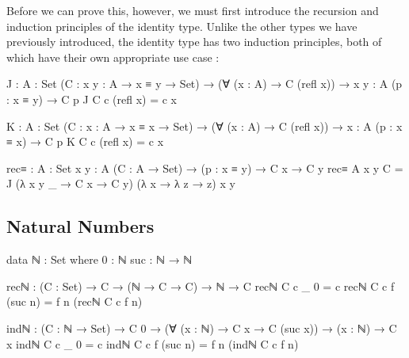 \documentclass[12pt]{article}
\begin{document}
Before we can prove this, however, we must first introduce the recursion and
induction principles of the identity type. Unlike the other types we have
previously introduced, the identity type has two induction principles, both of
which have their own appropriate use case \cite{}:
\begin{center}
\begin{minipage}{0.9\textwidth}
\begin{code}
J : {A : Set} (C : {x y : A} → x ≡ y → Set) →
    (∀ (x : A) → C (refl x)) →
    {x y : A} (p : x ≡ y) → C p
J C c (refl x) = c x

K : {A : Set} (C : {x : A} → x ≡ x → Set) →
    (∀ (x : A) → C (refl x)) →
    {x : A} (p : x ≡ x) → C p
K C c (refl x) = c x

rec≡ : {A : Set} {x y : A} (C : A → Set) →
       (p : x ≡ y) → C x → C y
rec≡ {A} {x} {y} C = 
  J (λ {x} {y} _ → C x → C y)
    (λ x → λ z → z)
    {x} {y} 
\end{code}
\end{minipage}
\end{center}




\subsection*{Natural Numbers}
\begin{center}
\begin{minipage}{0.9\textwidth}
\begin{code}
data ℕ : Set where
  0 : ℕ
  suc : ℕ → ℕ

recℕ : (C : Set) → C → (ℕ → C → C) → ℕ → C
recℕ C c _ 0 = c
recℕ C c f (suc n) = f n (recℕ C c f n) 

indℕ : (C : ℕ → Set) → C 0 →
       (∀ (x : ℕ) → C x → C (suc x)) →
       (x : ℕ) → C x
indℕ C c _ 0 = c
indℕ C c f (suc n) = f n (indℕ C c f n)
\end{code}
\end{minipage}
\end{center}
\end{document}
